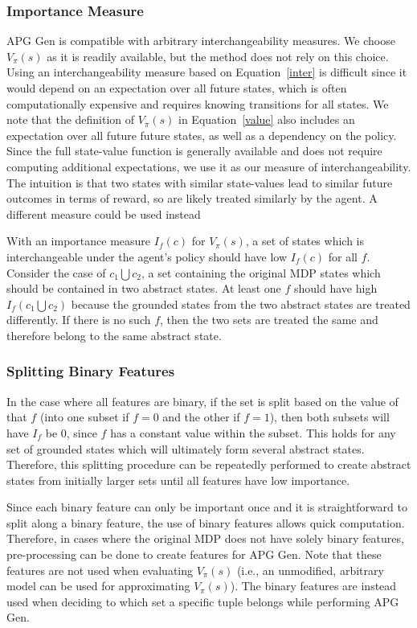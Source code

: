 \documentclass[letterpaper]{article} %
\begin{document}
\subsubsection{Importance Measure}
APG Gen is compatible with arbitrary interchangeability measures. We choose $V_{\pi}(s)$ as it is readily available, but the method does not rely on this choice. Using an interchangeability measure based on Equation~\ref{inter} is difficult since it would depend on an expectation over all future states, which is often computationally expensive and requires knowing transitions for all states. We note that the definition of $V_{\pi}(s)$ in Equation~\ref{value} also includes an expectation over all future future states, as well as a dependency on the policy. Since the full state-value function is generally available and does not require computing additional expectations, we use it as our measure of interchangeability. The intuition is that two states with similar state-values lead to similar future outcomes in terms of reward, so are likely treated similarly by the agent. A different measure could be used instead

With an importance measure $I_f(c)$ for $V_{\pi}(s)$, a set of states which is interchangeable under the agent's policy should have low $I_f(c)$ for all $f$. Consider the case of $c_1 \bigcup c_2$, a set containing the original MDP states which should be contained in two abstract states. 
At least one $f$ should have high $I_f(c_1 \bigcup c_2)$ because the grounded states from the two abstract states are treated differently. 
If there is no such $f$, then the two sets are treated the same and therefore belong to the same abstract state.

\subsubsection{Splitting Binary Features}
In the case where all features are binary, if the set is split based on the value of that $f$ (into one subset if $f=0$ and the other if $f=1$), then both subsets will have $I_f$ be 0, since $f$ has a constant value within the subset. This holds for any set of grounded states which will ultimately form several abstract states. Therefore, this splitting procedure can be repeatedly performed to create abstract states from initially larger sets until all features have low importance.

Since each binary feature can only be important once and it is straightforward to split along a binary feature, the use of binary features allows quick computation. Therefore, in cases where the original MDP does not have solely binary features, pre-processing can be done to create features for APG Gen. Note that these features are not used when evaluating $V_{\pi}(s)$ (i.e., an unmodified, arbitrary model can be used for approximating $V_{\pi}(s)$). The binary features are instead used when deciding to which set a specific tuple belongs while performing APG Gen. 
\end{document}

